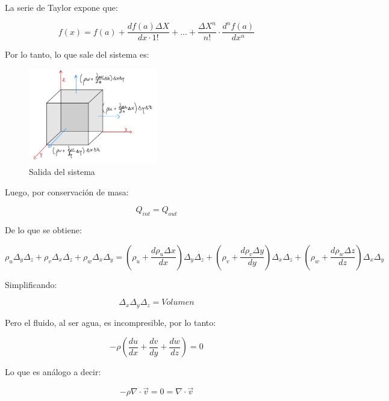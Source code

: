 La serie de Taylor expone que:

\begin{equation}
    f(x) = f(a) + \frac{df(a) \Delta X}{dx \cdot 1!} + ... + \frac{\Delta X^n}{n!} \cdot \frac{d^n f(a)}{dx^n}
\end{equation}

Por lo tanto, lo que sale del sistema es:

\begin{figure}[H]
    \centering
    \includegraphics[width=0.5\textwidth]{FOTOS/out.jpg}
    \caption{Salida del sistema}
    \label{fig:ley_darcy_out}
\end{figure}

Luego, por conservación de masa:

\begin{equation}
    Q_{int} = Q_{out}
\end{equation}

De lo que se obtiene:

\begin{equation}
    \rho_u \Delta_y \Delta_z + \rho_v \Delta_x \Delta_z + \rho_w \Delta_x \Delta_y = (\rho_u + \frac{d\rho_u \Delta x}{dx})\Delta_y \Delta_z + (\rho_v + \frac{d\rho_v \Delta y}{dy})\Delta_x \Delta_z + (\rho_w + \frac{d\rho_w \Delta z}{dz})\Delta_x \Delta_y
\end{equation}

Simplificando:

\begin{equation}
    \Delta_x \Delta_y \Delta_z = Volumen
\end{equation}

Pero el fluido, al ser agua, es incompresible, por lo tanto:

\begin{equation}
   -\rho(\frac{du}{dx}+ \frac{dv}{dy}+ \frac{dw}{dz}) = 0
\end{equation}

Lo que es análogo a decir:

\begin{equation}
    -\rho \nabla \cdot \vec{v} = 0 = \nabla \cdot \vec{v}
\end{equation}

